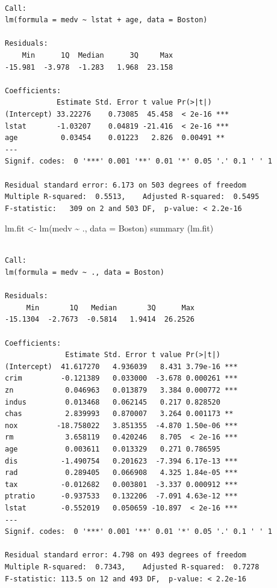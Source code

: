 \documentclass[
  letterpaper,
  DIV=11,
  numbers=noendperiod]{scrartcl}
\newenvironment{Shaded}{\begin{snugshade}}{\end{snugshade}}
\newcommand{\AttributeTok}[1]{\textcolor[rgb]{0.40,0.45,0.13}{#1}}
\newcommand{\FunctionTok}[1]{\textcolor[rgb]{0.28,0.35,0.67}{#1}}
\newcommand{\NormalTok}[1]{\textcolor[rgb]{0.00,0.23,0.31}{#1}}
\newcommand{\OtherTok}[1]{\textcolor[rgb]{0.00,0.23,0.31}{#1}}
\newcommand{\SpecialCharTok}[1]{\textcolor[rgb]{0.37,0.37,0.37}{#1}}
\begin{document}
\begin{verbatim}

Call:
lm(formula = medv ~ lstat + age, data = Boston)

Residuals:
    Min      1Q  Median      3Q     Max 
-15.981  -3.978  -1.283   1.968  23.158 

Coefficients:
            Estimate Std. Error t value Pr(>|t|)    
(Intercept) 33.22276    0.73085  45.458  < 2e-16 ***
lstat       -1.03207    0.04819 -21.416  < 2e-16 ***
age          0.03454    0.01223   2.826  0.00491 ** 
---
Signif. codes:  0 '***' 0.001 '**' 0.01 '*' 0.05 '.' 0.1 ' ' 1

Residual standard error: 6.173 on 503 degrees of freedom
Multiple R-squared:  0.5513,    Adjusted R-squared:  0.5495 
F-statistic:   309 on 2 and 503 DF,  p-value: < 2.2e-16
\end{verbatim}

\begin{Shaded}
\begin{Highlighting}[]
\NormalTok{lm.fit }\OtherTok{\textless{}{-}} \FunctionTok{lm}\NormalTok{(medv }\SpecialCharTok{\textasciitilde{}}\NormalTok{ ., }\AttributeTok{data =}\NormalTok{ Boston)}
\FunctionTok{summary}\NormalTok{ (lm.fit)}
\end{Highlighting}
\end{Shaded}

\begin{verbatim}

Call:
lm(formula = medv ~ ., data = Boston)

Residuals:
     Min       1Q   Median       3Q      Max 
-15.1304  -2.7673  -0.5814   1.9414  26.2526 

Coefficients:
              Estimate Std. Error t value Pr(>|t|)    
(Intercept)  41.617270   4.936039   8.431 3.79e-16 ***
crim         -0.121389   0.033000  -3.678 0.000261 ***
zn            0.046963   0.013879   3.384 0.000772 ***
indus         0.013468   0.062145   0.217 0.828520    
chas          2.839993   0.870007   3.264 0.001173 ** 
nox         -18.758022   3.851355  -4.870 1.50e-06 ***
rm            3.658119   0.420246   8.705  < 2e-16 ***
age           0.003611   0.013329   0.271 0.786595    
dis          -1.490754   0.201623  -7.394 6.17e-13 ***
rad           0.289405   0.066908   4.325 1.84e-05 ***
tax          -0.012682   0.003801  -3.337 0.000912 ***
ptratio      -0.937533   0.132206  -7.091 4.63e-12 ***
lstat        -0.552019   0.050659 -10.897  < 2e-16 ***
---
Signif. codes:  0 '***' 0.001 '**' 0.01 '*' 0.05 '.' 0.1 ' ' 1

Residual standard error: 4.798 on 493 degrees of freedom
Multiple R-squared:  0.7343,    Adjusted R-squared:  0.7278 
F-statistic: 113.5 on 12 and 493 DF,  p-value: < 2.2e-16
\end{verbatim}
\end{document}
